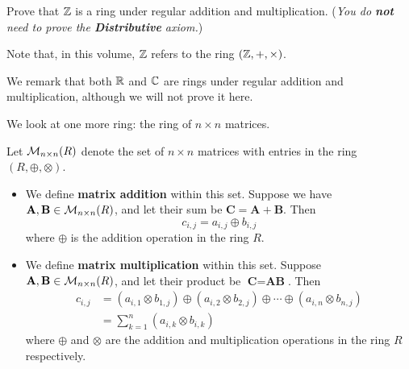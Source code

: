 \begin{exercise}
    Prove that $\mathbb{Z}$ is a ring under regular addition and multiplication.\newline
    (\textit{You do \textbf{not} need to prove the \textbf{Distributive} axiom.})
\end{exercise}
Note that, in this volume, $\mathbb{Z}$ refers to the ring $(\mathbb{Z}, +, \times)$.

We remark that both $\mathbb{R}$ and $\mathbb{C}$ are rings under regular addition and multiplication, although we will not prove it here.

We look at one more ring: the ring of $n \times n$ matrices.

Let $\mathcal{M}_{n\times n}(R)$ denote the set of $n\times n$ matrices with entries in the ring $(R, \oplus, \otimes)$.
\begin{itemize}
    \item We define \textbf{matrix addition} within this set. Suppose we have $\textbf{A}, \textbf{B} \in \mathcal{M}_{n\times n}(R)$, and let their sum be $\textbf{C} = \textbf{A} + \textbf{B}$. Then
    \[
        c_{i,j} = a_{i,j} \oplus b_{i,j}    
    \]
    where $\oplus$ is the addition operation in the ring $R$.
    
    \item We define \textbf{matrix multiplication} within this set. Suppose $\textbf{A}, \textbf{B} \in \mathcal{M}_{n\times n}(R)$, and let their product be $\textbf{C} = \textbf{AB}$. Then
    \begin{align*}
        c_{i,j} &= (a_{i,1}\otimes b_{1,j}) \oplus (a_{i,2}\otimes b_{2,j}) \oplus \cdots \oplus (a_{i,n}\otimes b_{n,j})\\
        &= \sum_{k=1}^n (a_{i,k}\otimes b_{i,k})
    \end{align*}
    where $\oplus$ and $\otimes$ are the addition and multiplication operations in the ring $R$ respectively.
\end{itemize}

